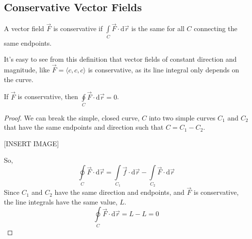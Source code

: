 \subsection{Conservative Vector Fields}
\begin{definition}
	A vector field $\vec{F}$ is conservative if $\int\limits_{C}{\vec{F} \cdot \mathrm{d}\vec{r}}$ is the same for all $C$ connecting the same endpoints.
\end{definition}

\noindent
It's easy to see from this definition that vector fields of constant direction and magnitude, like $\vec{F}=\langle c, c, c \rangle$ is conservative, as its line integral only depends on the curve.\\

\begin{theorem}
	If $\vec{F}$ is conservative, then $\oint\limits_{C}{\vec{F} \cdot \mathrm{d}\vec{r}} = 0$.
\end{theorem}
\begin{proof}
	We can break the simple, closed curve, $C$ into two simple curves $C_1$ and $C_2$ that have the same endpoints and direction such that $C = C_1-C_2$.
	
	[INSERT IMAGE]
	
	\noindent
	So, 
	\begin{equation*}
		\oint\limits_{C}{\vec{F} \cdot \mathrm{d}\vec{r}} = \int\limits_{C_1}{\vec{f} \cdot \mathrm{d}\vec{r}} - \int\limits_{C_2}{\vec{F} \cdot \mathrm{d}\vec{r}}
	\end{equation*}
	Since $C_1$ and $C_2$ have the same direction and endpoints, and $\vec{F}$ is conservative, the line integrals have the same value, $L$.
	\begin{equation*}
		\oint\limits_{C}{\vec{F} \cdot \mathrm{d}\vec{r}} = L - L = 0	
	\end{equation*}
\end{proof}